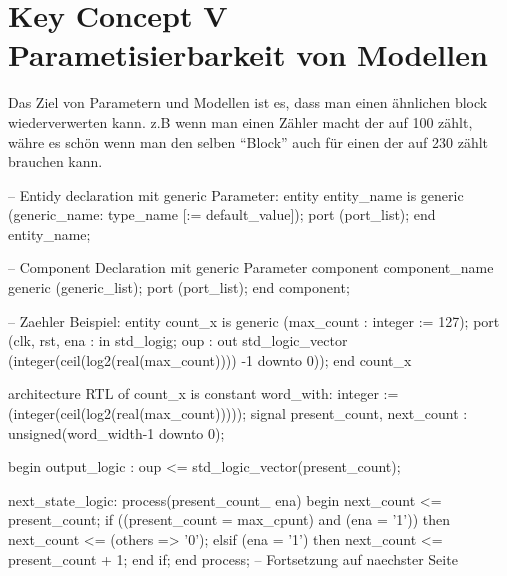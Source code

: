 
\section{Key Concept V \tiny Parametisierbarkeit von Modellen}

\begin{minipage}{0.01\textwidth}
	\text{ } %
\end{minipage}
\begin{minipage}{0.38\textwidth}

	Das Ziel von Parametern und Modellen ist es, dass man einen ähnlichen block wiederverwerten kann. z.B wenn man einen Zähler macht der auf 100 zählt, währe es schön wenn man den selben "`Block"' auch für einen der auf 230 zählt brauchen kann. 
	
	\begin{VHDL}
-- Entidy declaration mit generic Parameter:
entity entity_name is
    generic	({generic_name: type_name [:= default_value]}); 
	port  	(port_list);
end entity_name;

-- Component Declaration mit generic Parameter
component component_name
	generic	(generic_list);
	port	(port_list);
end component;
	\end{VHDL}
\end{minipage}
\begin{minipage}{0.02\textwidth}
	\text{ } %
\end{minipage}
\begin{minipage}{0.58\textwidth}
	\begin{VHDL}
-- Zaehler Beispiel:
entity count_x is
	generic (max_count : integer := 127);
	port	(clk, rst, ena	: in std_logig;
			 oup			: out std_logic_vector
			 		(integer(ceil(log2(real(max_count)))) -1 downto 0));
end count_x

architecture RTL of count_x is 
	constant word_with: integer :=(integer(ceil(log2(real(max_count)))));
	signal present_count, next_count : unsigned(word_width-1 downto 0);
	
begin
	output_logic : oup <= std_logic_vector(present_count);	
	
	next_state_logic: process(present_count_ ena)
	begin
		next_count <= present_count;
		if ((present_count = max_cpunt) and (ena = '1')) then 
			next_count <= (others => '0');
		elsif (ena = '1') then next_count <= present_count + 1;
		end if;
	end process;
	-- Fortsetzung auf naechster Seite
\end{VHDL}
\end{minipage}

